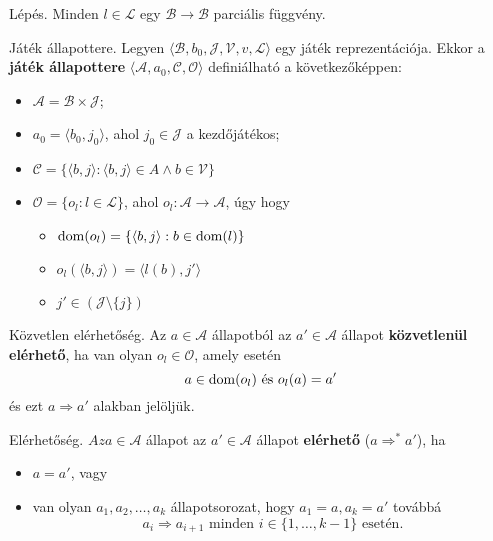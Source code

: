\begin{definicio}
    Lépés.
    Minden $l \in \mathcal{L}$ egy $\mathcal{B} \to \mathcal{B}$
    parciális függvény.

\end{definicio}

\begin{definicio}
    Játék állapottere.
    Legyen $\langle \mathcal{B}, b_0, \mathcal{J}, \mathcal{V}, \hat{v},
    \mathcal{L} \rangle$ egy játék reprezentációja. Ekkor a \textbf{játék
    állapottere} $\langle \mathcal{A}, a_0, \mathcal{C}, \mathcal{O} \rangle$
    definiálható a következőképpen:
     \begin{itemize}
         \item $\mathcal{A} = \mathcal{B} \times \mathcal{J}$;
         \item $a_0 = \langle b_0, j_0 \rangle$, ahol $j_0 \in \mathcal{J}$ a kezdőjátékos;
         \item $\mathcal{C} = \{\langle b, j \rangle : \langle b, j \rangle \in A \land b \in \mathcal{V}\} $
         \item $\mathcal{O} = \{o_l : l \in \mathcal{L}\}$, ahol $o_l :
             \mathcal{A} \to \mathcal{A}$, úgy hogy
             \begin{itemize}
                 \item $\operatorname{dom}(o_l) = \{ \langle b, j \rangle : b \in \operatorname{dom}(l)\}$
                 \item $o_l(\langle b, j \rangle) = \langle l(b), j'\rangle$
                 \item  $j' \in \left(\mathcal{J} \setminus  \{j\}
                     \right) $
             \end{itemize}

     \end{itemize}
\end{definicio}

\begin{definicio}
    Közvetlen elérhetőség.
    Az $a \in \mathcal{A}$ állapotból az $a' \in \mathcal{A}$ állapot
    \textbf{közvetlenül elérhető}, ha van olyan $o_l \in \mathcal{O}$,
    amely esetén \[
        a \in \operatorname{dom}(o_l) \text{  és  } o_l(a) = a'
    \]
    és ezt $a \Rightarrow a'$ alakban jelöljük.
\end{definicio}

\begin{definicio}
    Elérhetőség.
    $Az a \in \mathcal{A}$ állapot az $a' \in \mathcal{A}$ állapot
    \textbf{elérhető} ($a \Rightarrow^* a'$), ha
    \begin{itemize}
        \item $a=a'$, vagy
        \item van olyan  $a_1, a_2, \ldots, a_k$ állapotsorozat, hogy
            $a_1=a, a_k=a'$ továbbá \[
                a_i \Rightarrow a_{i+1} \text{ minden }
                i \in \{1, \ldots, k-1\} \text{ esetén}
            .\]
    \end{itemize}
\end{definicio}

